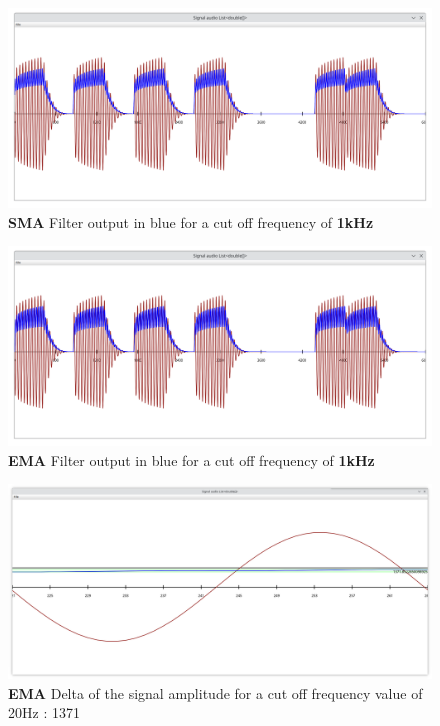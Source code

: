 \begin{figure}[!h]
	\begin{center}
		\includegraphics[width=15cm]{images/LP116.png}
	\end{center}
	\caption{\textbf{SMA} Filter output in blue for a cut off frequency of \textbf{1kHz}}
\end{figure}

\begin{figure}[!h]
	\begin{center}
		\includegraphics[width=15cm]{images/LP21000.png}
	\end{center}
	\caption{\textbf{EMA} Filter output in blue for a cut off frequency of \textbf{1kHz}}
\end{figure}

\begin{figure}[!h]
	\begin{center}
		\includegraphics[width=15cm]{images/EMA20d1371.png}
	\end{center}
	\caption{\textbf{EMA} Delta of the signal amplitude for a cut off frequency value of 20Hz : 1371}
\end{figure}

